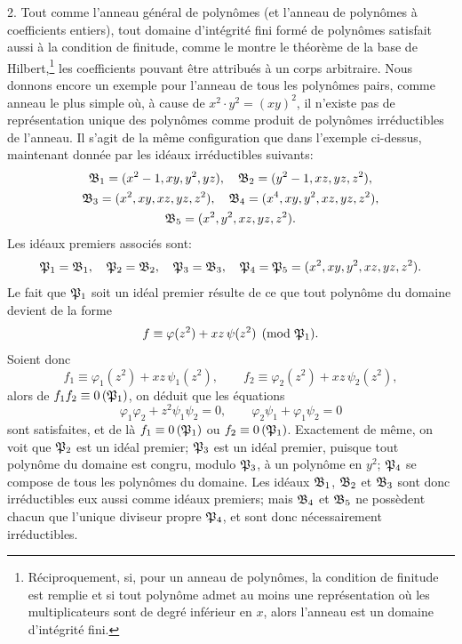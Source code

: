 2. Tout comme l'anneau général de polynômes (et l'anneau de polynômes à coefficients entiers), tout domaine d'intégrité fini formé de polynômes satisfait aussi à la condition de finitude, comme le montre le théorème de la base de Hilbert,\footnote{Réciproquement, si, pour un anneau de polynômes, la condition de finitude est remplie et si tout polynôme admet au moins une représentation où les multiplicateurs sont de degré inférieur en $x$, alors l'anneau est un domaine d'intégrité fini.} les coefficients pouvant être attribués à un corps arbitraire. Nous donnons encore un exemple pour l'anneau de tous les polynômes pairs, comme anneau le plus simple où, à cause de $x^2\cdot y^2=(xy)^2$, il n'existe pas de représentation unique des polynômes comme produit de polynômes irréductibles de l'anneau. Il s'agit de la même configuration que dans l'exemple ci-dessus, maintenant donnée par les idéaux irréductibles suivants:
\[
\begin{gathered}
 \mathfrak{B}_1=(x^2-1,xy,y^2,yz),\quad
 \mathfrak{B}_2=(y^2-1,xz,yz,z^2),\\
 \mathfrak{B}_3=(x^2,xy,xz,yz,z^2),\quad
 \mathfrak{B}_4=(x^4,xy,y^2,xz,yz,z^2),\\
 \mathfrak{B}_5=(x^2,y^2,xz,yz,z^2).
\end{gathered}
\]
Les idéaux premiers associés sont:
\[
 \mathfrak{P}_1=\mathfrak{B}_1,
 \quad \mathfrak{P}_2=\mathfrak{B}_2,
 \quad \mathfrak{P}_3=\mathfrak{B}_3,
 \quad \mathfrak{P}_4=\mathfrak{P}_5=(x^2,xy,y^2,xz,yz,z^2).
\]
Le fait que $\mathfrak{P}_1$ soit un idéal premier résulte de ce que tout polynôme du domaine devient de la forme
\[
 f\equiv\varphi(z^2)+xz\,\psi(z^2)\pmod{\mathfrak{P}_1}.
\]
Soient donc
\[
 f_1\equiv\varphi_1(z^2)+xz\,\psi_1(z^2),
 \qquad
 f_2\equiv\varphi_2(z^2)+xz\,\psi_2(z^2),
\]
alors de $f_1f_2\equiv 0\,(\mathfrak{P}_1)$, on déduit que les équations
\[
 \varphi_1\varphi_2+z^2\psi_1\psi_2=0,
 \qquad
 \varphi_2\psi_1+\varphi_1\psi_2=0
\]
sont satisfaites, et de là $f_1\equiv 0\,(\mathfrak{P}_1)$ ou $f_2\equiv 0\,(\mathfrak{P}_1)$. Exactement de même, on voit que $\mathfrak{P}_2$ est un idéal premier; $\mathfrak{P}_3$ est un idéal premier, puisque tout polynôme du domaine est congru, modulo $\mathfrak{P}_3$, à un polynôme en $y^2$; $\mathfrak{P}_4$ se compose de tous les polynômes du domaine. Les idéaux $\mathfrak{B}_1$, $\mathfrak{B}_2$ et $\mathfrak{B}_3$ sont donc irréductibles eux aussi comme idéaux premiers; mais $\mathfrak{B}_4$ et $\mathfrak{B}_5$ ne possèdent chacun que l'unique diviseur propre $\mathfrak{P}_4$, et sont donc nécessairement irréductibles.

